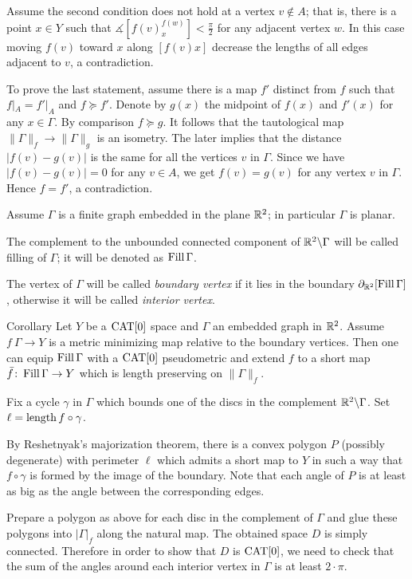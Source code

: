 \documentclass[a4paper,10pt]{amsart}
\begin{document}
Assume the second condition does not hold at a vertex $v\notin A$;
that is, there is a point $x\in Y$ such that
$\measuredangle[f(v)^{f(w)}_x]< \tfrac\pi2$
for any adjacent vertex $w$.
In this case moving $f(v)$ toward $x$ along $[f(v)x]$ decrease the lengths of all edges adjacent to $v$, a contradiction.

To prove the last statement, assume there is a map $f'$ distinct from $f$ such that $f|_A=f'|_A$ and $f\succcurlyeq f'$.
Denote by $g(x)$ the midpoint of $f(x)$ and $f'(x)$ for any $x\in \Gamma$. 
By comparison $f\succcurlyeq g$.
It follows that the tautological map $\|\Gamma\|_f\to \|\Gamma\|_g$ is an isometry.
The later implies that the distance $|f(v)-g(v)|$ is the same for all the vertices $v$ in $\Gamma$.
Since we have $|f(v)-g(v)|=0$ for any $v\in A$,
we get $f(v)=g(v)$ for any vertex $v$ in $\Gamma$.
Hence $f=f'$, a contradiction.
\qeds

Assume $\Gamma$ is a finite graph embedded in the plane $\mathbb{R}^2$;
in particular $\Gamma$ is planar.

The complement to the unbounded connected component of $\mathbb{R}^2\backslash\Gamma$ will be called filling of $\Gamma$;
it will be denoted as $\mathop{\rm Fill}\Gamma$.

The vertex of $\Gamma$ will be called \emph{boundary vertex}
if it lies in the boundary $\partial_{\mathbb{R}^2}[\mathop{\rm Fill}\Gamma]$,
otherwise it will be called \emph{interior vertex}.

\begin{thm}{Corollary}\label{cor:planar-minimizing-graph}
Let $Y$ be a $\mathop{\rm CAT}\nolimits[0]$ space and
$\Gamma$ an embedded graph in $\mathbb{R}^2$.
Assume $f\:\Gamma\to Y$ is a metric minimizing map relative to the boundary vertices. 
Then 
one can equip $\mathop{\rm Fill}\Gamma$ with a $\mathop{\rm CAT}\nolimits[0]$ pseudometric 
and extend $f$ to a short map $\bar f\colon\mathop{\rm Fill}\Gamma\to Y$ which is length preserving on $\|\Gamma\|_f$.
\end{thm}

Fix a cycle $\gamma$ in $\Gamma$ which bounds one of the discs in the complement $\mathbb{R}^2\backslash \Gamma$.
Set $\ell=\mathop{\rm length}\nolimits f\circ\gamma$.

By Reshetnyak's majorization theorem, there is a convex polygon $P$ (possibly degenerate) with perimeter $\ell$ which admits 
a short map to $Y$ in such a way that $f\circ\gamma$ is formed by the image of the boundary.
Note that each angle of $P$ is at least as big as 
the angle between the corresponding edges.

Prepare a polygon as above for each disc in the complement of $\Gamma$
and glue these polygons into $|\Gamma|_f$ along the natural map.
The obtained space $D$ is simply connected.
Therefore in order to show that $D$ is $\mathop{\rm CAT}\nolimits[0]$,
we need to check that the sum of the angles around each interior vertex in $\Gamma$ is at least $2\cdot\pi$.
\end{document}
